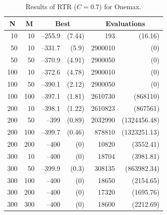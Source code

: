 \begin{table}
\centering
\caption{Results of RTR ($C=0.7$) for Onemax.}
\begin{tabular}{|r|r|rr|rr|}
\hline
\multicolumn{1}{|c|}{N} & \multicolumn{1}{|c|}{M} & 
\multicolumn{2}{c|}{Best} & \multicolumn{2}{c|}{Evaluations} \\ \hline
10 & 10 & --255.9 &  (7.44) & 193 &  (16.16) \\ \hline
50 & 10 & --331.7 &  (5.9) & 2900010 &  (0) \\ \hline
50 & 50 & --370.9 &  (4.91) & 2900050 &  (0) \\ \hline
100 & 10 & --372.6 &  (4.78) & 2900010 &  (0) \\ \hline
100 & 50 & --390.1 &  (2.12) & 2900050 &  (0) \\ \hline
100 & 100 & --397.1 &  (1.81) & 2610730 &  (868110) \\ \hline
200 & 10 & --398.1 &  (1.22) & 2610823 &  (867561) \\ \hline
200 & 50 & --399 &  (0.89) & 2032990 &  (1324456.48) \\ \hline
200 & 100 & --399.7 &  (0.46) & 878810 &  (1323251.13) \\ \hline
200 & 200 & --400 &  (0) & 10820 &  (3552.41) \\ \hline
300 & 10 & --400 &  (0) & 18704 &  (3981.81) \\ \hline
300 & 50 & --399.9 &  (0.3) & 308135 &  (863982.34) \\ \hline
300 & 100 & --400 &  (0) & 18650 &  (2154.65) \\ \hline
300 & 200 & --400 &  (0) & 17320 &  (1695.76) \\ \hline
300 & 300 & --400 &  (0) & 18600 &  (2212.69) \\ \hline
\end{tabular}
\label{result_0d_rtr}
\end{table}

\vspace{0.5cm}

